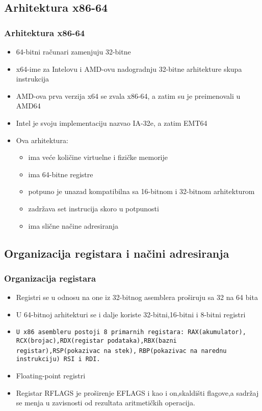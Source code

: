 \documentclass[hyperref={pdfpagelabels=false}]{beamer}
\begin{document}
\subsection{Arhitektura x86-64}
	\begin{frame}
		\frametitle{Arhitektura x86-64} 
		\pause
		\begin{itemize} 
			\item 64-bitni ra\v cunari zamenjuju 32-bitne \pause
			\item x64-ime za Intelovu i AMD-ovu nadogradnju 32-bitne arhitekture skupa instrukcija \pause
			\item AMD-ova prva verzija x64 se zvala x86-64, a zatim su je preimenovali u AMD64\pause
			\item Intel je svoju implementaciju nazvao IA-32e, a zatim EMT64\pause
			\item Ova arhitektura:\pause
			\begin{itemize}
				\item ima ve\' ce koli\v cine virtuelne i fizi\v cke memorije\pause
				\item ima 64-bitne registre\pause
				\item potpuno je unazad kompatibilna sa 16-bitnom i 32-bitnom arhitekturom\pause
				\item zadr\v zava set instrucija skoro u potpunosti\pause
				\item ima sli\v cne na\v cine adresiranja
			\end{itemize}
		\end{itemize}
	\end{frame}

	
\subsection{Organizacija registara i na\v cini adresiranja}
	\begin{frame}[fragile]
		\frametitle{Organizacija registara}
		\begin{itemize}
			\item \pause Registri se u odnosu na one iz 32-bitnog asemblera pro\v siruju sa 32 na 64 bita\pause
			\item U 64-bitnoj arhitekturi se i dalje koriste 32-bitni,16-bitni i 8-bitni registri\pause
			\item
				\verb|U x86 asembleru postoji 8 primarnih registara: RAX(akumulator), RCX(brojac),RDX(registar podataka),RBX(bazni registar),RSP(pokazivac na stek),|
				\verb|RBP(pokazivac na narednu instrukciju) RSI i RDI.|\pause
			\item Floating-point registri\pause
			\item Registar RFLAGS je pro\v sirenje EFLAGS i kao i on,skaldi\v sti flagove,a sadr\v zaj se menja u zavisnosti od rezultata aritmeti\v ckih operacija.\pause
		\end{itemize}
	\end{frame}
	
\end{document}
